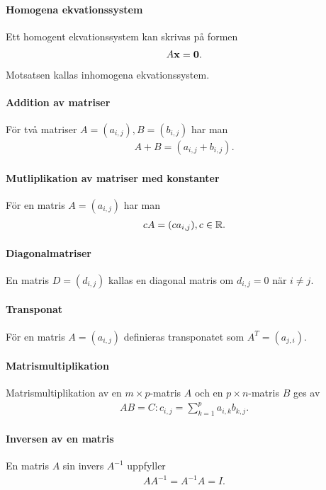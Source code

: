 \paragraph{Homogena ekvationssystem}
Ett homogent ekvationssystem kan skrivas på formen
\begin{align*}
	A\vect{x} = \vect{0}.
\end{align*}
Motsatsen kallas inhomogena ekvationssystem.

\paragraph{Addition av matriser}
För två matriser $A = (a_{i,j}), B = (b_{i,j})$ har man
\begin{align*}
	A + B = (a_{i,j} + b_{i,j}).
\end{align*} 

\paragraph{Mutliplikation av matriser med konstanter}
För en matris $A = (a_{i,j})$ har man
\begin{align*}
	cA = (ca_{i,j}), c\in\mathbb{R}.
\end{align*}

\paragraph{Diagonalmatriser}
En matris $D = (d_{i,j})$ kallas en diagonal matris om $d_{i,j} = 0$ när $i\neq j$.

\paragraph{Transponat}
För en matris $A = (a_{i,j})$ definieras transponatet som $A^T = (a_{j,i})$.

\paragraph{Matrismultiplikation}
Matrismultiplikation av en $m\times p$-matris $A$ och en $p\times n$-matris $B$ ges av
\begin{align*}
	AB = C: c_{i,j} = \sum\limits_{k = 1}^{p} a_{i, k}b_{k,j}.
\end{align*}

\paragraph{Inversen av en matris}
En matris $A$ sin invers $A^{-1}$ uppfyller
\begin{align*}
	AA^{-1} = A^{-1}A = I.
\end{align*}

